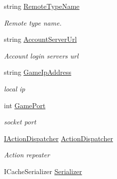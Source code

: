 \begin{DoxyCompactItemize}
string \mbox{\hyperlink{class_t_net_1_1_runtime_1_1_zone_setting_aa2da647e91d231327da6453715bd771e}{Remote\+Type\+Name}}
\begin{DoxyCompactList}\small\item\em Remote type name. \end{DoxyCompactList}\item 
string \mbox{\hyperlink{class_t_net_1_1_runtime_1_1_zone_setting_a178009d48b1761c93d437fe090ed2467}{Account\+Server\+Url}}
\begin{DoxyCompactList}\small\item\em Account login server\textquotesingle{}s url \end{DoxyCompactList}\item 
string \mbox{\hyperlink{class_t_net_1_1_runtime_1_1_zone_setting_a7ab310d2b4ad05f81bf36540de8c3e69}{Game\+Ip\+Address}}
\begin{DoxyCompactList}\small\item\em local ip \end{DoxyCompactList}\item 
int \mbox{\hyperlink{class_t_net_1_1_runtime_1_1_zone_setting_a10871966e6058c21c55e0c3b17a202f5}{Game\+Port}}
\begin{DoxyCompactList}\small\item\em socket port \end{DoxyCompactList}\item 
\mbox{\hyperlink{interface_t_net_1_1_contract_1_1_i_action_dispatcher}{I\+Action\+Dispatcher}} \mbox{\hyperlink{class_t_net_1_1_runtime_1_1_zone_setting_a877854c0a877de34218eeec4fa903dc6}{Action\+Dispatcher}}
\begin{DoxyCompactList}\small\item\em Action repeater \end{DoxyCompactList}\item 
I\+Cache\+Serializer \mbox{\hyperlink{class_t_net_1_1_runtime_1_1_zone_setting_a9643726aec5b9ec70b8f7d13aea762ea}{Serializer}}
\end{DoxyCompactItemize}


